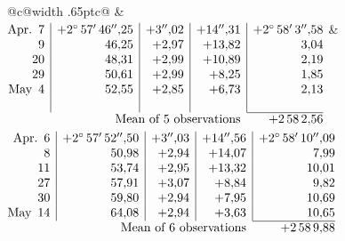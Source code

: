 \noindent\begin{tabular}{@{}c@{\hspace{.4em}\vrule width .65pt\hspace{.4em}}c@{}}
 &
 \\[.18ex]
\(\begin{array}[t]{@{}r|r|r|r|r@{}}
\text{Apr.}\enspace 7 & +2^\circ\,57'\,46''{,}25 & +3''{,}02 & +14''{,}31 & +2^\circ\,58'\,3''{,}58\\
9 & 46{,}25 & +2{,}97 & +13{,}82 & 3{,}04\\
20 & 48{,}31 & +2{,}99 & +10{,}89 & 2{,}19\\
29 & 50{,}61 & +2{,}99 & +8{,}25 & 1{,}85\\
\text{May}\enspace 4 & 52{,}55 & +2{,}85 & +6{,}73 & 2{,}13\\
 & & & & \\
\cline{5-5}
\multicolumn{4}{r}{\text{Mean of 5 observations}} & +2\,58\,2{,}56
\end{array}\)
&
\(\begin{array}[t]{@{}r|r|r|r|r@{}}
\text{Apr.}\enspace 6 & +2^\circ\,57'\,52''{,}50 & +3''{,}03 & +14''{,}56 & +2^\circ\,58'\,10''{,}09\\
8 & 50{,}98 & +2{,}94 & +14{,}07 & 7{,}99\\
11 & 53{,}74 & +2{,}95 & +13{,}32 & 10{,}01\\
27 & 57{,}91 & +3{,}07 & +8{,}84 & 9{,}82\\
30 & 59{,}80 & +2{,}94 & +7{,}95 & 10{,}69\\
\text{May}\enspace 14 & 64{,}08 & +2{,}94 & +3{,}63 & 10{,}65\\
\cline{5-5}
\multicolumn{4}{r}{\text{Mean of 6 observations}} & +2\,58\,9{,}88
\end{array}\)
\end{tabular}\par\medskip
